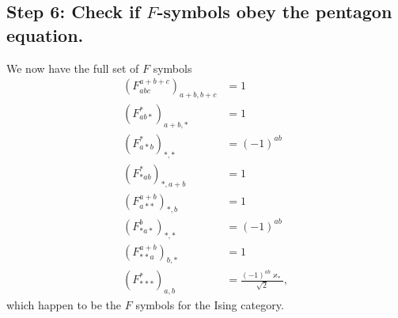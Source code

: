 \subsection*{Step 6: Check if $F$-symbols obey the pentagon equation.} 
We now have the full set of $F$ symbols
	\begin{align*}
		\left(F_{abc}^{a+b+c}\right)_{a+b,b+c}&=1\\
		\left(F_{ab*}^*\right)_{a+b,*}&=1\\
		\left(F_{a*b}^*\right)_{*,*}&=(-1)^{ab}\\
		\left(F_{*ab}^*\right)_{*,a+b}&=1\\
		\left(F_{a**}^{a+b}\right)_{*,b}&=1\\
		\left(F_{*a*}^b\right)_{*,*}&=(-1)^{ab}\\
		\left(F_{**a}^{a+b}\right)_{b,*}&=1\\
		\left(F_{***}^*\right)_{a,b}&=\frac{(-1)^{ab}\varkappa_*}{\sqrt{2}},
	\end{align*}
which happen to be the $F$ symbols for the Ising category. 